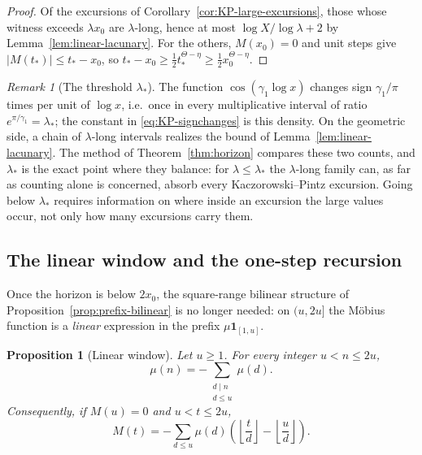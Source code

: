 \documentclass[11pt]{amsart}
\numberwithin{equation}{section}
\theoremstyle{plain}
\newtheorem{proposition}[theorem]{Proposition}
\theoremstyle{definition}
\theoremstyle{remark}
\newtheorem{remark}[theorem]{Remark}
\begin{document}
\begin{proof}
Of the excursions of Corollary~\ref{cor:KP-large-excursions}, those whose
witness exceeds $\lambda x_0$ are $\lambda$-long, hence at most
$\log X/\log\lambda+2$ by Lemma~\ref{lem:linear-lacunary}. For the others,
$M(x_0)=0$ and unit steps give $|M(t_*)|\le t_*-x_0$, so
$t_*-x_0\ge\frac12t_*^{\Theta-\eta}\ge\frac12x_0^{\Theta-\eta}$.
\end{proof}

\begin{remark}[The threshold $\lambda_*$]
\label{rem:lambda-star}
The function $\cos(\gamma_1\log x)$ changes sign $\gamma_1/\pi$ times per
unit of $\log x$, i.e.\ once in every multiplicative interval of ratio
$e^{\pi/\gamma_1}=\lambda_*$; the constant in \eqref{eq:KP-signchanges} is
this density. On the geometric side, a chain of $\lambda$-long intervals
realizes the bound of Lemma~\ref{lem:linear-lacunary}. The method of
Theorem~\ref{thm:horizon} compares these two counts, and $\lambda_*$ is the
exact point where they balance: for $\lambda\le\lambda_*$ the $\lambda$-long
family can, as far as counting alone is concerned, absorb every
Kaczorowski--Pintz excursion. Going below $\lambda_*$ requires information
on where inside an excursion the large values occur, not only how many
excursions carry them.
\end{remark}

\subsection{The linear window and the one-step recursion}
\label{subsec:linear-window}

Once the horizon is below $2x_0$, the square-range bilinear structure of
Proposition~\ref{prop:prefix-bilinear} is no longer needed: on $(u,2u]$ the
M\"obius function is a \emph{linear} expression in the prefix
$\mu\mathbf 1_{[1,u]}$.

\begin{proposition}[Linear window]
\label{prop:linear-window}
Let $u\ge1$. For every integer $u<n\le2u$,
\begin{equation}
\label{eq:linear-window-mu}
\mu(n)=-\sum_{\substack{d\mid n\\ d\le u}}\mu(d).
\end{equation}
Consequently, if $M(u)=0$ and $u<t\le2u$,
\begin{equation}
\label{eq:linear-window-M}
M(t)=-\sum_{d\le u}\mu(d)\left(\left\lfloor\frac td\right\rfloor
-\left\lfloor\frac ud\right\rfloor\right).
\end{equation}
\end{proposition}
\end{document}
